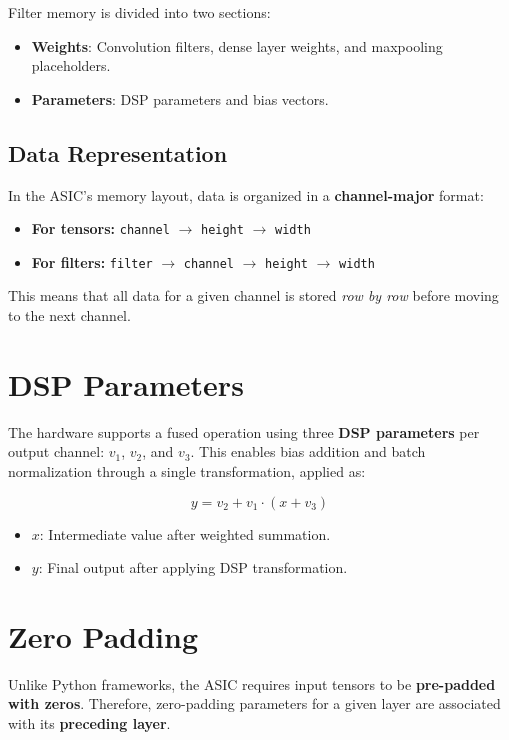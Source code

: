 \documentclass[12pt]{report}
\begin{document}
Filter memory is divided into two sections:

\begin{itemize}
    \item \textbf{Weights}: Convolution filters, dense layer weights, and maxpooling placeholders.
    \item \textbf{Parameters}: DSP parameters and bias vectors.
\end{itemize}

\subsection{Data Representation}
In the ASIC’s memory layout, data is organized in a \textbf{channel-major} format:

\begin{itemize}
    \item \textbf{For tensors:} \texttt{channel} $\rightarrow$ \texttt{height} $\rightarrow$ \texttt{width}
    \item \textbf{For filters:} \texttt{filter} $\rightarrow$ \texttt{channel} $\rightarrow$ \texttt{height} $\rightarrow$ \texttt{width}
\end{itemize}

This means that all data for a given channel is stored \textit{row by row} before moving to the next channel.

\section{DSP Parameters}

The hardware supports a fused operation using three \textbf{DSP parameters} per output channel: $v_1$, $v_2$, and $v_3$. This enables bias addition and batch normalization through a single transformation, applied as:

\[
    y = v_2 + v_1 \cdot (x + v_3)
\]

\begin{itemize}
    \item $x$: Intermediate value after weighted summation.
    \item $y$: Final output after applying DSP transformation.
\end{itemize}

\section{Zero Padding}

Unlike Python frameworks, the ASIC requires input tensors to be \textbf{pre-padded with zeros}. Therefore, zero-padding parameters for a given layer are associated with its \textbf{preceding layer}.
\end{document}
